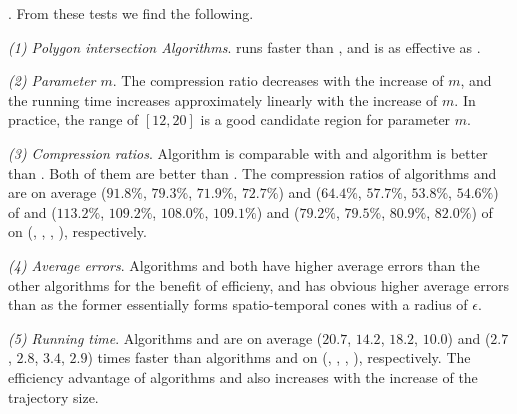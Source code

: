 .
From these tests we find the following.

\sstab \emph{(1) Polygon intersection Algorithms}. \rpia runs faster than \cpia, and is as effective as \cpia.

\sstab\emph{(2) Parameter $m$}. The compression ratio decreases with the increase of $m$, and the running time increases approximately linearly with the increase of $m$. In practice, the range of $[12, 20]$ is a good candidate region for parameter $m$.

\sstab\emph{(3) Compression ratios}. Algorithm \cist is comparable with \dps and algorithm \cista is better than \dps.
Both of them are better than \squishe.
The compression ratios of algorithms \cist and \cista are on average ($91.8\%$, $79.3\%$, $71.9\%$, {$72.7\%$}) and ($64.4\%$, $57.7\%$, $53.8\%$, {$54.6\%$}) of \squishe and ($113.2\%$, $109.2\%$, $108.0\%$, $109.1\%$) and ($79.2\%$, $79.5\%$, $80.9\%$, $82.0\%$) of \dps on (\truck, \sercar, \geolife, \pricar), respectively.


\sstab\emph{(4) Average errors}. {Algorithms \cist and \cista both have higher average errors than the other algorithms for the benefit of efficieny, and \cista has obvious higher average errors than \cist as the former essentially forms spatio-temporal cones with a radius of $\epsilon$.}

\sstab\emph{(5) Running time}. Algorithms \cist and \cista are on average ($20.7$, $14.2$, $18.2$, $10.0$) and ($2.7$, $2.8$, $3.4$, {$2.9$}) times faster than algorithms \dps and \squishe on (\truck, \sercar, {\geolife}, \pricar), respectively. The efficiency advantage of algorithms \cist and \cista also increases  with the increase of the trajectory size.









